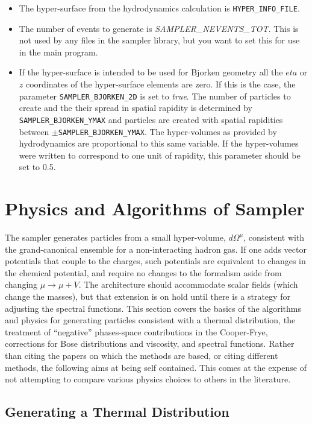 \begin{itemize}
\item The hyper-surface from the hydrodynamics calculation is {\tt HYPER\_INFO\_FILE}.
\item The number of events to generate is {\it SAMPLER\_NEVENTS\_TOT}. This is not used by any files in the sampler library, but you want to set this for use in the main program.
\item If the hyper-surface is intended to be used for Bjorken geometry all the $eta$ or $z$ coordinates of the hyper-surface elements are zero. If this is the case, the parameter {\tt SAMPLER\_BJORKEN\_2D} is set to {\it true}. The number of particles to create and the their spread in spatial rapidity is determined by {\tt SAMPLER\_BJORKEN\_YMAX} and particles are created with spatial rapidities between $\pm${\tt SAMPLER\_BJORKEN\_YMAX}. The hyper-volumes as provided by hydrodynamics are proportional to this same variable. If the hyper-volumes were written to correspond to one unit of rapidity, this parameter should be set to 0.5.
\end{itemize}


\section{Physics and Algorithms of Sampler}

The sampler generates particles from a small hyper-volume, $d\Omega^\mu$, consistent with the grand-canonical ensemble for a non-interacting hadron gas. If one adds vector potentials that couple to the charges, such potentials are equivalent to changes in the chemical potential, and require no changes to the formalism aside from changing $\mu\rightarrow\mu+V$. The architecture should accommodate scalar fields (which change the masses), but that extension is on hold until there is a strategy for adjusting the spectral functions. This section covers the basics of the algorithms and physics for generating particles consistent with a thermal distribution, the treatment of ``negative'' phases-space contributions in the Cooper-Frye, corrections for Bose distributions and viscosity, and spectral functions. Rather than citing the papers on which the methods are based, or citing different methods, the following aims at being self contained. This comes at the expense of not attempting to compare various physics choices to others in the literature.

\subsection{Generating a Thermal Distribution}

